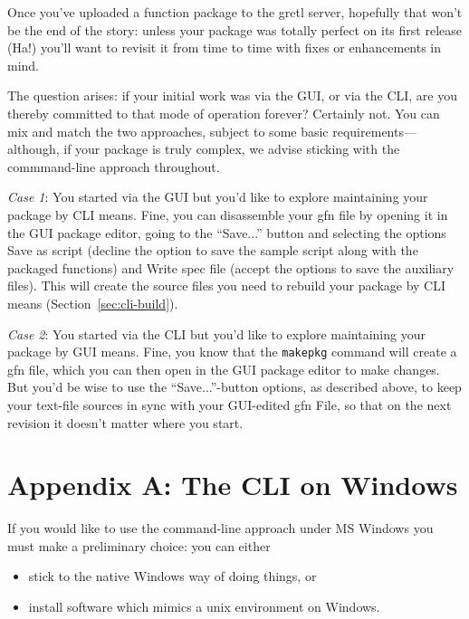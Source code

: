 \documentclass[oneside]{book}
\begin{document}
Once you've uploaded a function package to the gretl server, hopefully
that won't be the end of the story: unless your package was totally
perfect on its first release (Ha!) you'll want to revisit it from time
to time with fixes or enhancements in mind.

The question arises: if your initial work was via the GUI, or via the
CLI, are you thereby committed to that mode of operation forever?
Certainly not. You can mix and match the two approaches, subject to
some basic requirements---although, if your package is truly complex,
we advise sticking with the commmand-line approach throughout.

\textit{Case 1}: You started via the GUI but you'd like to explore
maintaining your package by CLI means. Fine, you can disassemble your
\textsf{gfn} file by opening it in the GUI package editor, going to
the ``\textsf{Save...}'' button and selecting the options \textsf{Save
  as script} (decline the option to save the sample script along with
the packaged functions) and \textsf{Write spec file} (accept the
options to save the auxiliary files). This will create the source
files you need to rebuild your package by CLI means
(Section~\ref{sec:cli-build}).

\textit{Case 2}: You started via the CLI but you'd like to explore
maintaining your package by GUI means. Fine, you know that the
\texttt{makepkg} command will create a \textsf{gfn} file, which you can
then open in the GUI package editor to make changes. But you'd be wise
to use the ``\textsf{Save...}''-button options, as described above, to
keep your text-file sources in sync with your GUI-edited \textsf{gfn}
File, so that on the next revision it doesn't matter where you start.

\clearpage

\section*{Appendix A: The CLI on Windows}

If you would like to use the command-line approach under MS Windows
you must make a preliminary choice: you can either
\begin{itemize}
\item stick to the native Windows way of doing things, or
\item install software which mimics a unix environment on Windows.
\end{itemize}
\end{document}
